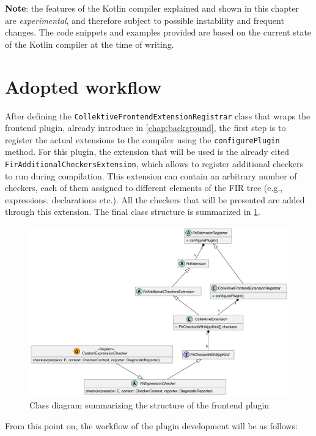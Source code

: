 \documentclass[12pt,a4paper,openright,twoside]{book}
\begin{document}
\textbf{Note}: the features of the Kotlin compiler explained and shown in
this chapter are \emph{experimental}, and therefore subject to possible instability
and frequent changes. The code snippets and examples provided are based on the
current state of the Kotlin compiler at the time of writing. 

\section{Adopted workflow}

After defining the \lstinline{CollektiveFrontendExtensionRegistrar} class that
wraps the frontend plugin, already introduce in \cref{chap:background}, the
first step is to register the actual extensions to the compiler using the
\lstinline{configurePlugin} method. For this plugin, the extension that will
be used is the already cited \lstinline{FirAdditionalCheckersExtension}, which
allows to register additional checkers to run during compilation.
%
This extension can contain an arbitrary number of checkers, each of them
assigned to different elements of the \ac{FIR} tree (e.g., expressions,
declarations etc.). All the checkers that will be presented are added 
through this extension. The final class structure is summarized in
\cref{fig:frontend-class-diagram}.

\begin{figure}
  \centering
  \includegraphics[width=.8\linewidth]{figures/frontend-class-diagram.pdf}
  \caption{Class diagram summarizing the structure of the frontend plugin}
  \label{fig:frontend-class-diagram}
\end{figure}

From this point on, the workflow of the plugin development will be as follows:
\end{document}
